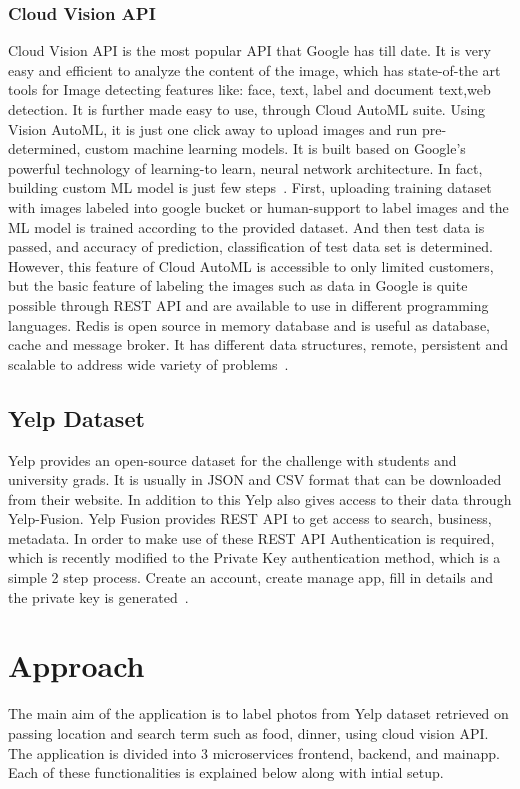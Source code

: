 \subsubsection{Cloud Vision API} Cloud Vision API is the most popular
  API that Google has till date. It is very easy and efficient to
  analyze the content of the image, which has state-of-the art tools
  for Image detecting features like: face, text, label and document
  text,web detection.  It is further made easy to use, through Cloud
  AutoML suite. Using Vision AutoML, it is just one click away to
  upload images and run pre-determined, custom machine learning
  models. It is built based on Google’s powerful technology of
  learning-to learn, neural network architecture. In fact, building
  custom ML model is just few
  steps~\cite{hid-sp18-602-cloud-automl}. First, uploading training
  dataset with images labeled into google bucket or human-support to
  label images and the ML model is trained according to the provided
  dataset. And then test data is passed, and accuracy of prediction,
  classification of test data set is determined. However, this feature
  of Cloud AutoML is accessible to only limited customers, but the
  basic feature of labeling the images such as data in Google is quite
  possible through REST API and are available to use in different
  programming languages.  Redis is open source in memory database and
  is useful as database, cache and message broker. It has different
  data structures, remote, persistent and scalable to address wide
  variety of problems~\cite{hid-sp18-602-cloud-vision}.

\subsection{Yelp Dataset}
Yelp provides an open-source dataset for the challenge with students
and university grads. It is usually in JSON and CSV format that can be
downloaded from their website. In addition to this Yelp also gives
access to their data through Yelp-Fusion. Yelp Fusion provides REST
API to get access to search, business, metadata. In order to make use
of these REST API Authentication is required, which is recently
modified to the Private Key authentication method, which is a simple 2
step process. Create an account, create manage app, fill in details
and the private key is generated~\cite{hid-sp18-602-yelp}.

\section{Approach}
The main aim of the application is to label photos from Yelp dataset
retrieved on passing location and search term such as food, dinner,
using cloud vision API. The application is divided into 3
microservices frontend, backend, and mainapp. Each of these
functionalities is explained below along with intial setup.

